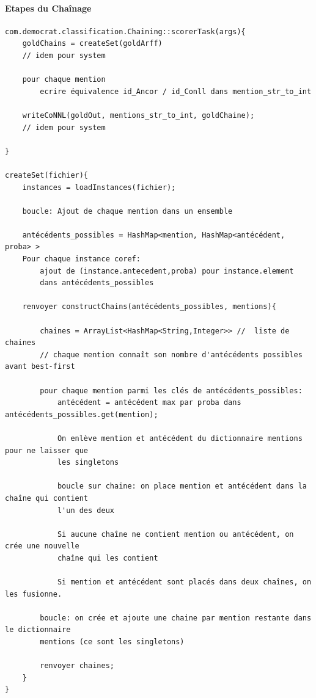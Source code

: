 \documentclass[a4paper,10pt]{report}
\begin{document}
    \paragraph{Etapes du Chaînage}
    \begin{verbatim}
com.democrat.classification.Chaining::scorerTask(args){
    goldChains = createSet(goldArff)
    // idem pour system
    
    pour chaque mention
        ecrire équivalence id_Ancor / id_Conll dans mention_str_to_int
    
    writeCoNNL(goldOut, mentions_str_to_int, goldChaine);
    // idem pour system
    
}

createSet(fichier){
    instances = loadInstances(fichier);
    
    boucle: Ajout de chaque mention dans un ensemble
    
    antécédents_possibles = HashMap<mention, HashMap<antécédent, proba> >
    Pour chaque instance coref:
        ajout de (instance.antecedent,proba) pour instance.element
        dans antécédents_possibles
      
    renvoyer constructChains(antécédents_possibles, mentions){

        chaines = ArrayList<HashMap<String,Integer>> //  liste de chaines
        // chaque mention connaît son nombre d'antécédents possibles avant best-first

        pour chaque mention parmi les clés de antécédents_possibles:
            antécédent = antécédent max par proba dans antécédents_possibles.get(mention);
            
            On enlève mention et antécédent du dictionnaire mentions pour ne laisser que 
            les singletons
            
            boucle sur chaine: on place mention et antécédent dans la chaîne qui contient 
            l'un des deux	                       
    
            Si aucune chaîne ne contient mention ou antécédent, on crée une nouvelle 
            chaîne qui les contient                                       
            
            Si mention et antécédent sont placés dans deux chaînes, on les fusionne.

        boucle: on crée et ajoute une chaine par mention restante dans le dictionnaire 
        mentions (ce sont les singletons)
        
        renvoyer chaines;
    }
}
    \end{verbatim}
\end{document}
